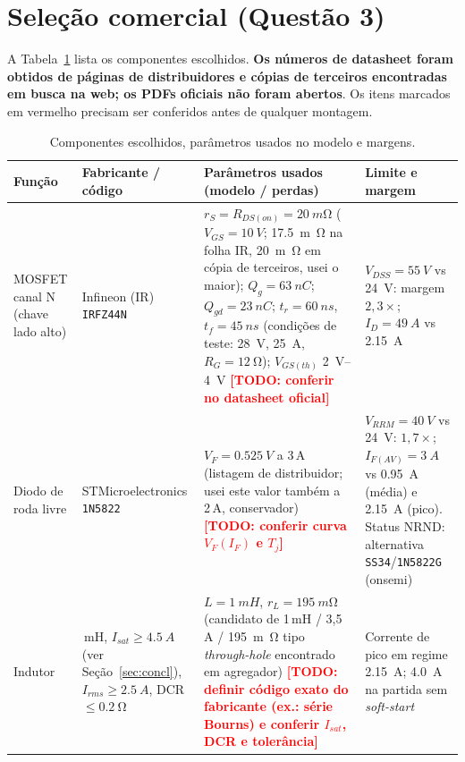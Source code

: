 \documentclass[11pt,a4paper]{article}
\newcommand{\TODO}[1]{\textcolor{red}{\textbf{[TODO: #1]}}}
\begin{document}
\section{Sele\c{c}\~ao comercial (Quest\~ao 3)}
A Tabela~\ref{tab:comp} lista os componentes escolhidos. \textbf{Os n\'umeros de datasheet foram obtidos de p\'aginas de distribuidores e c\'opias de terceiros encontradas em busca na web; os PDFs oficiais n\~ao foram abertos}. Os itens marcados em vermelho precisam ser conferidos antes de qualquer montagem.

\begin{table}[h]
\centering
\caption{Componentes escolhidos, par\^ametros usados no modelo e margens.}
\label{tab:comp}
\footnotesize
\begin{tabularx}{\linewidth}{@{}>{\raggedright\arraybackslash}p{2.1cm} >{\raggedright\arraybackslash}p{2.6cm} >{\raggedright\arraybackslash}X >{\raggedright\arraybackslash}X@{}}
\toprule
Fun\c{c}\~ao & Fabricante / c\'odigo & Par\^ametros usados (modelo / perdas) & Limite e margem \\ \midrule
MOSFET canal N (chave lado alto) & Infineon (IR) \texttt{IRFZ44N}~\cite{ds_irfz44n} &
 $r_S=R_{DS(on)}=\SI{20}{m\ohm}$ ($V_{GS}=\SI{10}{V}$; \SI{17,5}{m\ohm} na folha IR, \SI{20}{m\ohm} em c\'opia de terceiros, usei o maior); $Q_g=\SI{63}{nC}$; $Q_{gd}=\SI{23}{nC}$; $t_r=\SI{60}{ns}$, $t_f=\SI{45}{ns}$ (condi\c{c}\~oes de teste: \SI{28}{V}, \SI{25}{A}, $R_G=\SI{12}{\ohm}$); $V_{GS(th)}$ \SIrange{2}{4}{V} \TODO{conferir no datasheet oficial} &
 $V_{DSS}=\SI{55}{V}$ vs \SI{24}{V}: margem $2{,}3\times$; $I_D=\SI{49}{A}$ vs \SI{2,15}{A} \\
Diodo de roda livre & STMicroelectronics \texttt{1N5822}~\cite{ds_1n5822} &
 $V_F=\SI{0,525}{V}$ a 3\,A (listagem de distribuidor; usei este valor tamb\'em a 2\,A, conservador) \TODO{conferir curva $V_F(I_F)$ e $T_j$} &
 $V_{RRM}=\SI{40}{V}$ vs \SI{24}{V}: $1{,}7\times$; $I_{F(AV)}=\SI{3}{A}$ vs \SI{0,95}{A} (m\'edia) e \SI{2,15}{A} (pico). Status NRND: alternativa \texttt{SS34}/\texttt{1N5822G} (onsemi) \\
Indutor & 1\,mH, $I_{sat}\ge\SI{4,5}{A}$ (ver Se\c{c}\~ao~\ref{sec:concl}), $I_{rms}\ge\SI{2,5}{A}$, DCR $\le\SI{0,2}{\ohm}$ &
 $L=\SI{1}{mH}$, $r_L=\SI{195}{m\ohm}$ (candidato de 1\,mH / 3,5\,A / \SI{195}{m\ohm} tipo \emph{through-hole} encontrado em agregador) \TODO{definir c\'odigo exato do fabricante (ex.: s\'erie Bourns) e conferir $I_{sat}$, DCR e toler\^ancia} &
 Corrente de pico em regime \SI{2,15}{A}; \SI{4,0}{A} na partida sem \emph{soft-start} \\

\end{tabularx}
\end{table}
\end{document}
